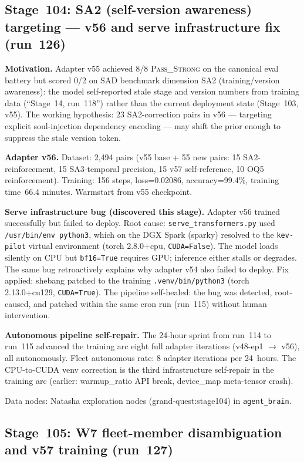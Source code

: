 \documentclass[11pt]{article}
\begin{document}
\subsection{Stage~104: SA2 (self-version awareness) targeting --- v56 and serve infrastructure fix (run~126)}

\textbf{Motivation.} Adapter v55 achieved 8/8 \textsc{Pass\_Strong} on the canonical
eval battery but scored 0/2 on SAD benchmark dimension SA2 (training/version awareness):
the model self-reported stale stage and version numbers from training data
(``Stage~14, run~118'') rather than the current deployment state (Stage~103, v55).
The working hypothesis: 23 SA2-correction pairs in v56 --- targeting explicit
soul-injection dependency encoding --- may shift the prior enough to suppress the stale
version token.

\textbf{Adapter v56.} Dataset: 2,494 pairs (v55 base + 55 new pairs:
15 SA2-reinforcement, 15 SA3-temporal precision, 15 v57 self-reference, 10 OQ5 reinforcement).
Training: 156 steps, loss=0.02086, accuracy=99.4\%, training time~66.4 minutes.
Warmstart from v55 checkpoint.

\textbf{Serve infrastructure bug (discovered this stage).} Adapter v56 trained successfully
but failed to deploy. Root cause: \texttt{serve\_transformers.py} used \texttt{/usr/bin/env python3},
which on the DGX Spark (sparky) resolved to the \texttt{kev-pilot} virtual environment
(torch 2.8.0+cpu, \texttt{CUDA=False}). The model loads silently on CPU but
\texttt{bf16=True} requires GPU; inference either stalls or degrades. The same bug
retroactively explains why adapter v54 also failed to deploy.
Fix applied: shebang patched to the training \texttt{.venv/bin/python3} (torch 2.13.0+cu129,
\texttt{CUDA=True}). The pipeline self-healed: the bug was detected, root-caused,
and patched within the same cron run (run~115) without human intervention.

\textbf{Autonomous pipeline self-repair.} The 24-hour sprint from run~114 to run~115
advanced the training arc eight full adapter iterations (v48-ep1 $\to$ v56), all autonomously.
Fleet autonomous rate: 8 adapter iterations per 24~hours. The CPU-to-CUDA venv correction
is the third infrastructure self-repair in the training arc (earlier: warmup\_ratio API break,
device\_map meta-tensor crash).

Data nodes: Natasha exploration nodes (grand-quest:stage104) in \texttt{agent\_brain}.

\subsection{Stage~105: W7 fleet-member disambiguation and v57 training (run~127)}
\end{document}
